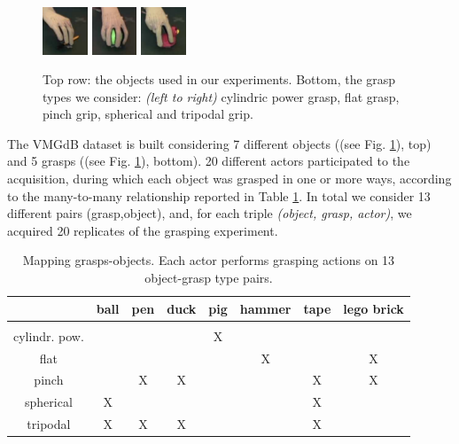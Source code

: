 \begin{figure}[tb]
	\includegraphics[width=0.12\textwidth]{images/objects/pinch}
	\includegraphics[width=0.12\textwidth]{images/objects/spherical}
	\includegraphics[width=0.12\textwidth]{images/objects/tripodal}
	\caption{Top row: the objects used in our experiments. Bottom, the grasp types we consider: \emph{(left to right)} cylindric power grasp, flat grasp, pinch grip, spherical and
	tripodal grip.}
	\label{fig::grasps}
\end{figure}

The VMGdB dataset is built considering 7 different objects ((see Fig. \ref{fig::grasps}), top) and 5 grasps ((see Fig. \ref{fig::grasps}), bottom).
 20 different actors participated to the acquisition, during which  
 each object was grasped in one or more  ways, according to the many-to-many relationship reported in Table \ref{tab:manytomany}. In total
we consider 13 different pairs (grasp,object), and, for each triple {\em (object, grasp, actor)}, we acquired 20 replicates of the grasping experiment.
 
 {\small
\begin{table}
\begin{tabular}{c | c c c c c c c}
& ball & pen & duck & pig & hammer & tape & lego brick \\
\hline \\
cylindr. pow. & & & & X & & & \\
flat & & & &  & X & & X \\
pinch & & X & X & & & X & X \\
spherical & X & & & & & X & \\
tripodal & X & X & X & & & X & 
\end{tabular}
\caption{\label{tab:manytomany} Mapping grasps-objects. Each actor performs grasping actions on 13
object-grasp type pairs.}
\end{table}
}
 
